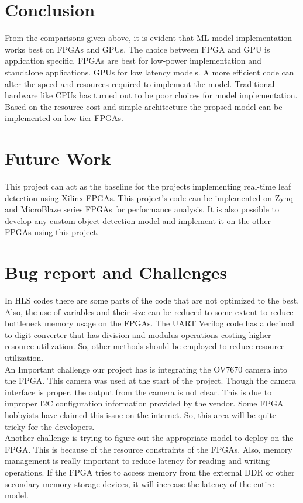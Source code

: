 \documentclass[a4paper,12pt,oneside]{book}
\begin{document}
\section{Conclusion}
From the comparisons given above, it is evident that ML model implementation works best on FPGAs and GPUs. The choice between FPGA and GPU is application specific. FPGAs are best for low-power implementation and standalone applications. GPUs for low latency models. A more efficient code can alter the speed and resources required to implement the model. Traditional hardware like CPUs has turned out to be poor choices for model implementation. Based on the resource cost and simple architecture the propsed model can be implemented on low-tier FPGAs.

\section{Future Work}
This project can act as the baseline for the projects implementing real-time leaf detection using Xilinx FPGAs. This project’s code can be implemented on Zynq and MicroBlaze series FPGAs for performance analysis. It is also possible to develop any custom object detection model and implement it on the other FPGAs using this project.

\section{Bug report and Challenges}
In HLS codes there are some parts of the code that are not optimized to the best. Also, the use of variables and their size can be reduced to some extent to reduce bottleneck memory usage on the FPGAs. The UART Verilog code has a decimal to digit converter that has division and modulus operations costing higher resource utilization. So, other methods should be employed to reduce resource utilization.\vspace{0.5cm}\\
An Important challenge our project has is integrating the OV7670 camera into the FPGA. This camera was used at the start of the project. Though the camera interface is proper, the output from the camera is not clear. This is due to improper I2C configuration information provided by the vendor. Some FPGA hobbyists have claimed this issue on the internet. So, this area will be quite tricky for the developers.\vspace{0.5cm}\\
Another challenge is trying to figure out the appropriate model to deploy on the FPGA. This is because of the resource constraints of the FPGAs. Also, memory management is really important to reduce latency for reading and writing operations. If the FPGA tries to access memory from the external DDR or other secondary memory storage devices, it will increase the latency of the entire model.
\end{document}
